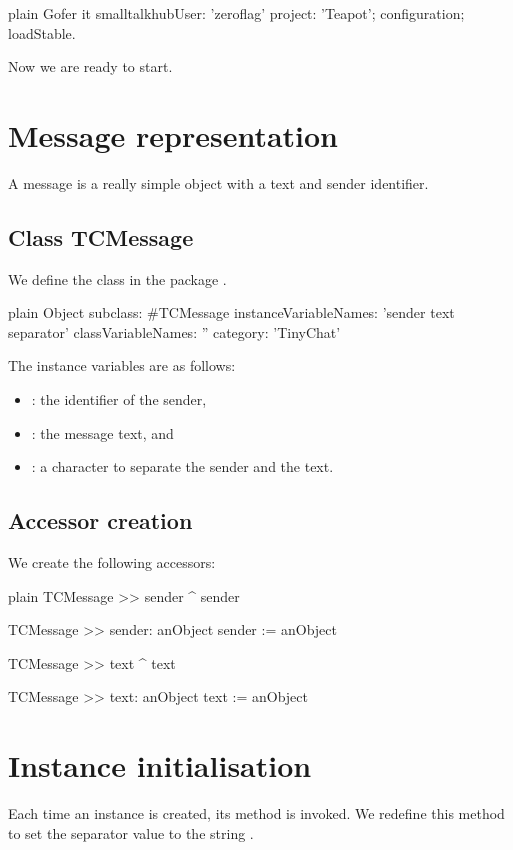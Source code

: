 \documentclass[10pt,twoside,english]{_support/latex/sbabook/sbabook}
\begin{document}
\begin{displaycode}{plain}
Gofer it
    smalltalkhubUser: 'zeroflag' project: 'Teapot';
    configuration;
    loadStable.
\end{displaycode}

Now we are ready to start.
\section{Message representation}
A message is a really simple object with a text and sender identifier. 
\subsection{Class TCMessage}
We define the class  in the package .

\begin{displaycode}{plain}
Object subclass: #TCMessage
	instanceVariableNames: 'sender text separator'
	classVariableNames: ''
	category: 'TinyChat'
\end{displaycode}

The instance variables are as follows: 

\begin{itemize}
\item {}: the identifier of the sender,
\item {}: the message text, and 
\item {}: a character to separate the sender and the text.
\end{itemize}
\subsection{Accessor creation}
We create the following accessors:

\begin{displaycode}{plain}
TCMessage >> sender
	^ sender

TCMessage >> sender: anObject
	sender := anObject

TCMessage >> text
	^ text

TCMessage >> text: anObject
	text := anObject
\end{displaycode}
\section{Instance initialisation}
Each time an instance is created, its  method is invoked. 
We redefine this method to set the separator value to the string \textcode{\textgreater{}}.
\end{document}
